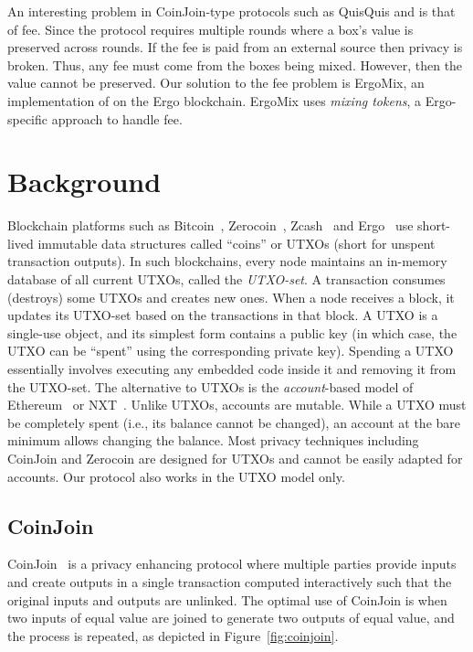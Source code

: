 \documentclass[runningheads]{llncs}
\newcommand{\mixname}{ErgoMix\xspace}
\newcommand{\zerocoin}{Zerocoin\xspace}
\begin{document}
An interesting problem in CoinJoin-type protocols such as QuisQuis and \algname is that of fee. Since the protocol requires multiple rounds where a box's value is preserved across rounds. If the fee is paid from an external source then privacy is broken. Thus, any fee must come from the boxes being mixed. However, then the value cannot be preserved.
Our solution to the fee problem is \mixname, an implementation of \algname on the Ergo blockchain. \mixname uses {\em mixing tokens}, a Ergo-specific approach to handle fee. 


\section{Background}

Blockchain platforms such as Bitcoin~\cite{Nak08}, \zerocoin~\cite{zerocoin}, Zcash~\cite{zcash} and Ergo~\cite{ergo} use short-lived immutable data structures called ``coins'' or UTXOs (short for {unspent transaction outputs}). In such blockchains, every node maintains an in-memory database of all current UTXOs, called the {\em UTXO-set}. A transaction consumes (destroys) some UTXOs and creates new ones. When a node receives a block, it updates its UTXO-set based on the transactions in that block. A UTXO is a single-use object, and its simplest form contains a public key (in which case, the UTXO can be ``spent'' using the corresponding private key). Spending a UTXO essentially involves executing any embedded code inside it and removing it from the UTXO-set. 
The alternative to UTXOs is the {\em account}-based model of Ethereum~\cite{wood2014ethereum} or NXT~\cite{nxt}. Unlike UTXOs, accounts are mutable. While a UTXO must be completely spent (i.e., its balance cannot be changed), an account at the bare minimum allows changing the balance. Most privacy techniques including CoinJoin and \zerocoin are designed for UTXOs and cannot be easily adapted for accounts. Our protocol also works in the UTXO model only. 

\subsection{CoinJoin} 
\label{coinjoin}
CoinJoin~\cite{coinjoin} is a privacy enhancing protocol where multiple parties provide inputs and create outputs in a single transaction computed interactively such that the original inputs and outputs are unlinked. The optimal use of CoinJoin is when two inputs of equal value are joined to generate two outputs of equal value, and the process is repeated, as depicted in Figure~\ref{fig:coinjoin}. 
\end{document}
